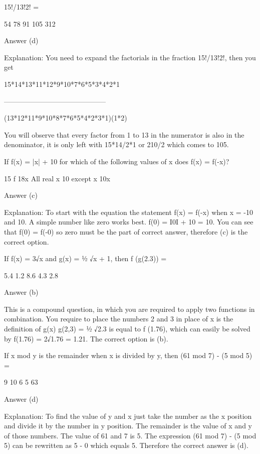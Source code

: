     15!/13!2! =

        54
        78
        91
        105
        312 

    Answer (d)

    Explanation: You need to expand the factorials in the fraction 15!/13!2!, then you get

    15*14*13*11*12*9*10*7*6*5*3*4*2*1

    --------------------------------------------

    (13*12*11*9*10*8*7*6*5*4*2*3*1)(1*2)

     

    You will observe that every factor from 1 to 13 in the numerator is also in the denominator, it is only left with 15*14/2*1 or 210/2 which comes to 105.

     

    If f(x) = |x| + 10 for which of the following values of x does f(x) = f(-x)?

        15 f
        18x
        All real x
        10 except x
        10x 

    Answer (c)

     

    Explanation: To start with the equation the statement f(x) = f(-x) when x = -10 and 10. A simple number like zero works best. f(0) = Ι0Ι + 10 = 10. You can see that f(0) = f(-0) so zero must be the part of correct answer, therefore (c) is the correct option.

    If f(x) = 3√x and g(x) = ½ √x + 1, then f (g(2.3)) =

        5.4
        1.2
        8.6
        4.3
        2.8 

    Answer (b)

    This is a compound question, in which you are required to apply two functions in combination. You require to place the numbers 2 and 3 in place of x is the definition of g(x) g(2,3) = ½ √2.3 is equal to f (1.76), which can easily be solved by f(1.76) = 2√1.76 = 1.21. The correct option is (b).

    If x mod y is the remainder when x is divided by y, then (61 mod 7) - (5 mod 5) =

        9
        10
        6
        5
        63 

    Answer (d)

    Explanation: To find the value of y and x just take the number as the x position and divide it by the number in y position. The remainder is the value of x and y of those numbers. The value of 61 and 7 is 5. The expression (61 mod 7) - (5 mod 5) can be rewritten as 5 - 0 which equals 5. Therefore the correct answer is (d).

